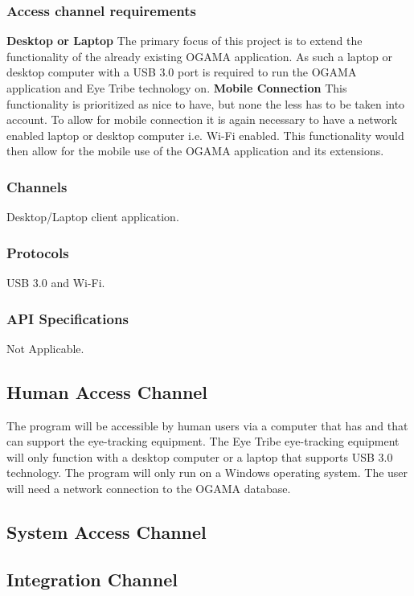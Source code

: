 \subsubsection{Access channel requirements}
\textbf{Desktop or Laptop}
\newline
The primary focus of this project is to extend the functionality of the already existing OGAMA application. As such a laptop or desktop computer with a USB 3.0 port is required to run the OGAMA application and Eye Tribe technology on.
\newline
\textbf{Mobile Connection}
\newline
 This functionality is prioritized as nice to have, but none the less has to be taken into account. To allow for mobile connection it is again necessary to have a network enabled laptop or desktop computer i.e. Wi-Fi enabled. This functionality would then allow for the mobile use of the OGAMA application and its extensions.\newline 

\subsubsection{Channels}
Desktop/Laptop client application.
\subsubsection{Protocols}
USB 3.0 and Wi-Fi.
\subsubsection{API Specifications}
Not Applicable.

\subsection{Human Access Channel}
    The program will be accessible by human users via a computer that has and that can support the eye-tracking equipment. The Eye Tribe eye-tracking equipment will only function with a desktop computer or a laptop that supports USB 3.0 technology. The program will only run on a Windows operating system. The user will need a network connection to the OGAMA database.
\subsection{System Access Channel}
\subsection{Integration Channel}
